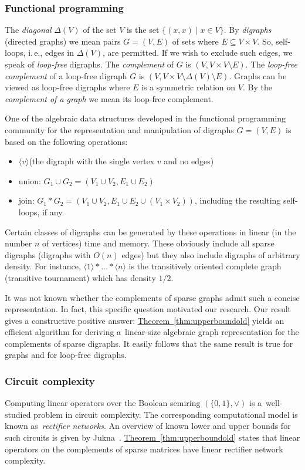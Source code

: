 \documentclass[11pt]{article}
\numberwithin{equation}{section}
\theoremstyle{definition}
\theoremstyle{plain}
\newcommand{\ie}{i.\,e.}
\newcommand{\expref}[2]{\hyperref[#2]{#1~\ref{#2}}}
\theoremstyle{plain}\newtheorem{observation}[theorem]{Observation}
\begin{document}
\subsubsection{Functional programming}

%
%
The \emph{diagonal} $\Delta(V)$ of the set $V$ is the set $\{(x,x)\mid x\in V\}$.
By \emph{digraphs} (directed graphs) we mean pairs $G=(V,E)$ of sets where
$E\subseteq V\times V$.  So, self-loops, \ie, edges in $\Delta(V)$, are
permitted.  If we wish to exclude such edges, we speak of \emph{loop-free}
digraphs.  The \emph{complement} of $G$ is $(V, V\times V\setminus E)$.
The \emph{loop-free complement} of a loop-free digraph $G$ is
$(V, V\times V \setminus \Delta(V)\setminus E)$.  Graphs can be viewed
as loop-free digraphs where $E$ is a symmetric relation on $V$.  By the
\emph{complement of a graph} we mean its loop-free complement.

One of the algebraic data structures developed in the functional programming
community for the representation and manipulation of digraphs
$G=(V,E)$ is based on the following operations:
\begin{itemize}
\item $\langle v\rangle$\quad (the digraph with the single vertex $v$ and no edges)
\item union: $G_1 \cup G_2 = (V_1 \cup V_2, E_1 \cup E_2)$
\item join: $G_1 \ast G_2 = (V_1 \cup V_2, E_1 \cup E_2 \cup (V_1 \times V_2))$, including
  the resulting self-loops, if any.
\end{itemize}
Certain classes of digraphs can be generated by these operations
in linear (in the number $n$ of vertices) time and memory.  These obviously
include all sparse digraphs (digraphs with $O(n)$ edges) but they also include
digraphs of arbitrary density.  For instance,
$\langle 1\rangle \ast \dots \ast \langle n\rangle$
is the transitively oriented complete graph
(transitive tournament) which has density $1/2$.  %
%

It was not known whether the
complements of sparse graphs admit such a concise representation.
%
%
%
%
%
In fact, this specific question motivated our research.  %
Our result gives a constructive positive answer:
\expref{Theorem}{thm:upperboundold} yields an
efficient algorithm for deriving a~linear-size algebraic graph representation
for the complements of sparse digraphs.
%
%
It easily follows that the same result is true for graphs and for
loop-free digraphs.  %

\subsubsection{Circuit complexity}  Computing linear operators over
the Boolean semiring $(\{0,1\}, \lor)$ is a~well-studied problem
in circuit complexity. The corresponding computational model is known
as~\emph{rectifier networks}. An overview of known lower and upper bounds for
such circuits is given by Jukna~\cite[Section~13.6]{DBLP:books/daglib/0028687}.
\expref{Theorem}{thm:upperboundold} states that linear operators on
the %
complements of
sparse matrices have linear rectifier network complexity.
\end{document}
